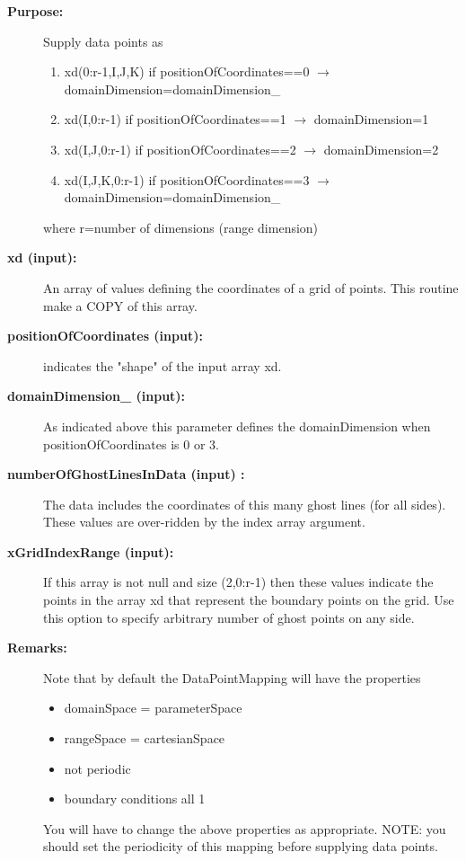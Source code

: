 \begin{description}
\item[{\bf Purpose:}]  
   Supply data points as
    \begin{enumerate}
      \item  xd(0:r-1,I,J,K) if positionOfCoordinates==0 $\rightarrow$ domainDimension=domainDimension\_
      \item  xd(I,0:r-1)     if positionOfCoordinates==1 $\rightarrow$ domainDimension=1
      \item  xd(I,J,0:r-1)   if positionOfCoordinates==2 $\rightarrow$ domainDimension=2
      \item  xd(I,J,K,0:r-1) if positionOfCoordinates==3 $\rightarrow$ domainDimension=domainDimension\_
    \end{enumerate}
   where r=number of dimensions (range dimension)
\item[{\bf xd (input):}]  An array of values defining the coordinates of a grid of points. This routine make a COPY
   of this array.
\item[{\bf positionOfCoordinates (input):}]  indicates the "shape" of the input array xd.
\item[{\bf domainDimension\_ (input):}]  As indicated above this parameter defines the domainDimension when
    positionOfCoordinates is 0 or 3.
\item[{\bf numberOfGhostLinesInData (input) :}]  The data includes the coordinates of this many ghost lines (for all sides).
    These values are over-ridden by the index array argument.
\item[{\bf xGridIndexRange (input):}]  If this array is not null and size (2,0:r-1) then these values indicate the 
    points in the array xd that represent the boundary points on the grid. Use this option to specify
    arbitrary number of ghost points on any side.
\item[{\bf Remarks:}] 
   Note that by default the DataPointMapping will have the properties
   \begin{itemize}
     \item domainSpace = parameterSpace
     \item rangeSpace = cartesianSpace
     \item not periodic
     \item boundary conditions all 1
   \end{itemize}
   You will have to change the above properties as appropriate.  
   NOTE: you should set the periodicity of this mapping before supplying data points.      
\end{description}
